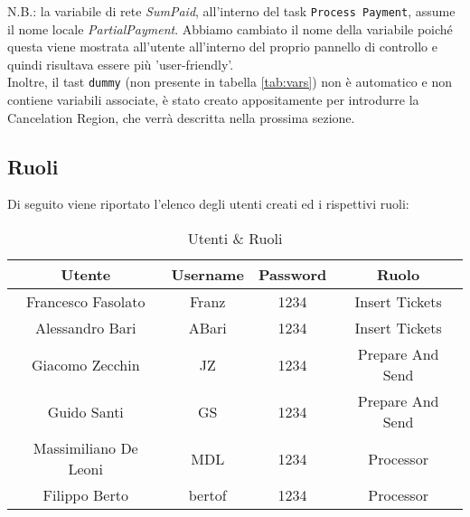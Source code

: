 \documentclass[../Relazione.tex]{subfiles}
\begin{document}
    \noindent N.B.: la variabile di rete \textit{SumPaid}, all'interno del task \texttt{Process Payment}, assume il nome locale \textit{PartialPayment}. Abbiamo cambiato il nome della variabile poiché questa viene mostrata all'utente all'interno del proprio pannello di controllo e quindi risultava essere più 'user-friendly'.\\
    Inoltre, il tast \texttt{dummy} (non presente in tabella \ref{tab:vars}) non è automatico e non contiene variabili associate, è stato creato appositamente per introdurre la Cancelation Region, che verrà descritta nella prossima sezione.
    
    \subsection{Ruoli}
    Di seguito viene riportato l'elenco degli utenti creati ed i rispettivi ruoli:
    
    \begin{table}[!h]
        \centering
        \begin{tabular}{|c|c|c|c|}
            \hline
            \textbf{Utente} & \textbf{Username} & \textbf{Password} & \textbf{Ruolo} \\
            \hline
             Francesco Fasolato & Franz & 1234 & Insert Tickets \\
             Alessandro Bari & ABari & 1234 & Insert Tickets \\
             Giacomo Zecchin & JZ & 1234 & Prepare And Send \\
             Guido Santi & GS & 1234 & Prepare And Send \\
             Massimiliano De Leoni & MDL & 1234 & Processor \\
             Filippo Berto & bertof & 1234 & Processor \\
             \hline
        \end{tabular}
        \caption{Utenti \& Ruoli}
        \label{tab:roles}
    \end{table}
    
         
\end{document}
